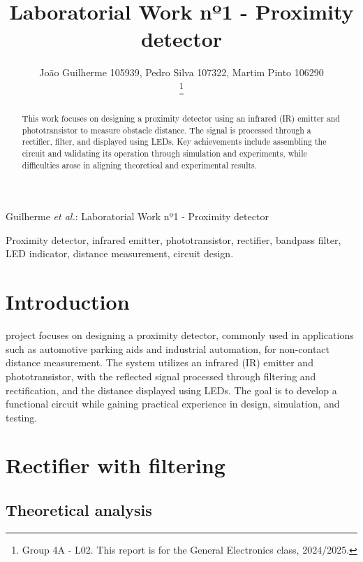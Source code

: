 \documentclass[lettersize,journal]{IEEEtran}
\begin{document}
\title{Laboratorial Work nº1 - Proximity detector}

\author{João Guilherme 105939, Pedro Silva 107322, Martim Pinto 106290\\
\thanks{Group 4A - L02. This report is for the General Electronics class, 2024/2025.}}

%
{Guilherme \MakeLowercase{\textit{et al.}}: Laboratorial Work nº1 - Proximity detector}

\maketitle

\begin{abstract}
This work focuses on designing a proximity detector using an infrared (IR) emitter and phototransistor to measure obstacle distance. The signal is processed through a rectifier, filter, and displayed using LEDs. Key achievements include assembling the circuit and validating its operation through simulation and experiments, while difficulties arose in aligning theoretical and experimental results.
\end{abstract}

\begin{IEEEkeywords} Proximity detector, infrared emitter, phototransistor, rectifier, bandpass filter, LED indicator, distance measurement, circuit design. 
\end{IEEEkeywords}

\section{Introduction}
 project focuses on designing a proximity detector, commonly used in applications such as automotive parking aids and industrial automation, for non-contact distance measurement. The system utilizes an infrared (IR) emitter and phototransistor, with the reflected signal processed through filtering and rectification, and the distance displayed using LEDs. The goal is to develop a functional circuit while gaining practical experience in design, simulation, and testing.

\section{Rectifier with filtering}
\subsection{Theoretical analysis}
\end{document}
